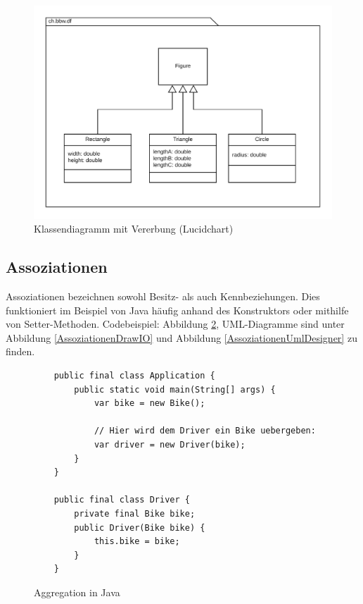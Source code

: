 \documentclass[a4paper, titlepage]{scrartcl}
\begin{document}
    \begin{figure}
        \includegraphics[width=\textwidth]{Klassendiagramm1c}
        \caption{Klassendiagramm mit Vererbung (Lucidchart)}
        \label{VererbungLucidchart}
    \end{figure}
    
    \subsection{Assoziationen}
    Assoziationen bezeichnen sowohl Besitz- als auch Kennbeziehungen.
    Dies funktioniert im Beispiel von Java häufig anhand des Konstruktors
    oder mithilfe von Setter-Methoden. Codebeispiel: Abbildung \ref{AggregationJava},
    UML-Diagramme sind unter Abbildung \ref{AssoziationenDrawIO} und
    Abbildung \ref{AssoziationenUmlDesigner} zu finden.

    \begin{figure}
    \begin{lstlisting}
    public final class Application {
        public static void main(String[] args) {
            var bike = new Bike();

            // Hier wird dem Driver ein Bike uebergeben:
            var driver = new Driver(bike);
        }
    }
    
    public final class Driver {
        private final Bike bike;
        public Driver(Bike bike) {
            this.bike = bike;
        }        
    }
    \end{lstlisting}
    \caption{Aggregation in Java}
    \label{AggregationJava}
    \end{figure}
\end{document}

